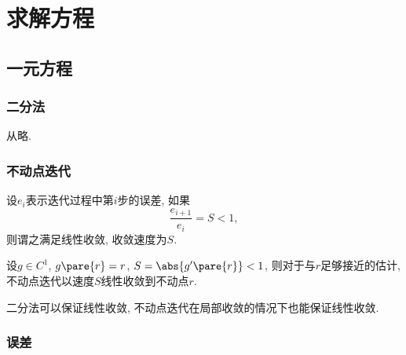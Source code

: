 \documentclass[20pt]{extarticle}
\begin{document}
\section{求解方程} %
\label{sec:求解方程}

\subsection{一元方程} %
\label{sub:一元方程}

\subsubsection{二分法} %
\label{ssub:二分法}

从略.


\subsubsection{不动点迭代} %
\label{ssub:不动点迭代}

\begin{definition}
    设$e_i$表示迭代过程中第$i$步的误差, 如果
    \[ \frac{e_{i+1}}{e_i} = S < 1, \]
    则谓之满足线性收敛, 收敛速度为$S$.
\end{definition}
\begin{theorem}
    设$g\in C^1$, $g\pare{r} = r$, $S = \abs{g'\pare{r}}<1$, 则对于与$r$足够接近的估计, 不动点迭代以速度$S$线性收敛到不动点$r$.
\end{theorem}
\begin{remark}
    二分法可以保证线性收敛, 不动点迭代在局部收敛的情况下也能保证线性收敛.
\end{remark}


\subsubsection{误差} %
\label{ssub:误差}
\end{document}
